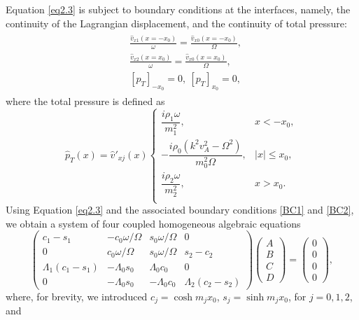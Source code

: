 Equation \eqref{eq2.3} is subject to boundary conditions at the interfaces, namely, the continuity of the Lagrangian displacement, and the continuity of total pressure:
\begin{align}
\begin{split}
\label{BC1}
& \frac{\hat v_{x1} (x = - x_0)}{\omega} = \frac{\hat v_{x0} (x = - x_0)}{\Omega}, \\
& \frac{\hat v_{x2} (x = x_0)}{\omega} = \frac{\hat v_{x0} (x = x_0)}{\Omega}, \\
& [p_T]_{-x_0} = 0, \ [p_T]_{x_0} = 0,
\end{split}
\end{align}
where the total pressure is defined as
\begin{equation}
\label{BC2}
\hat p_{T} (x) = \hat{v}'_{xj} (x)
\begin{cases}
\dfrac{i \rho_1 \omega}{m_1^2},    & x < - x_0, \\
-\dfrac{i \rho_0 (k^2 v_A^2 - \Omega^2)}{m_0^2 \Omega},  & |x| \leq x_0, \\
\dfrac{i \rho_2 \omega}{m_2^2},    & x > x_0. \\
\end{cases}
\end{equation}
Using Equation \eqref{eq2.3} and the associated boundary conditions \eqref{BC1} and \eqref{BC2}, 
we obtain a system of four coupled homogeneous algebraic equations
\begin{equation}
\label{BC3}
\begin{pmatrix}
c_1 - s_1 
& - c_0 \omega/\Omega
& s_0 \omega/\Omega
& 0
\\
0
& c_0 \omega/\Omega
& s_0 \omega/\Omega
& s_2 - c_2
\\
\Lambda_1 (c_1 - s_1)
& - \Lambda_0 s_0
& \Lambda_0 c_0
& 0
\\
0
& - \Lambda_0 s_0
& - \Lambda_0 c_0
& \Lambda_2 (c_2 - s_2)
\end{pmatrix}
\begin{pmatrix}
A
\\
B
\\
C
\\
D
\end{pmatrix}
=
\begin{pmatrix}
0
\\
0
\\
0
\\
0
\end{pmatrix},
\end{equation}
where, for brevity, we introduced $c_j = \cosh m_j x_0$, $s_j = \sinh m_j x_0$, for $j = 0,1,2$, and
